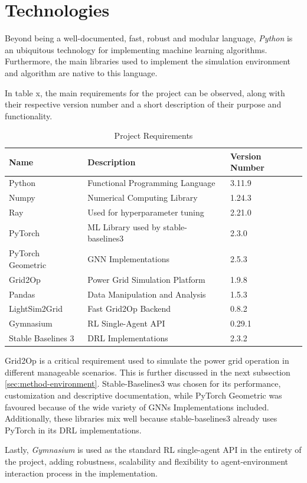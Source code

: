 \section{Technologies} \label{sec:method-technologies}

Beyond being a well-documented, fast, robust and modular language, \textit{Python} is an ubiquitous technology for implementing machine learning algorithms. Furthermore, the main libraries used to implement the simulation environment and algorithm are native to this language. \par
In table x, the main requirements for the project can be observed, along with their respective version number and a short description of their purpose and functionality.
\par

\begin{table}
	\begin{tabular}{|l|l|l|}
		\hline
		\textbf{Name} & \textbf{Description} & \textbf{Version Number} \\
		\hline
		Python & Functional Programming Language & 3.11.9 \\
		\hline
		Numpy & Numerical Computing Library& 1.24.3 \\
		\hline
		Ray & Used for hyperparameter tuning & 2.21.0 \\
		\hline
		PyTorch & \acs{ML} Library used by stable-baselines3 & 2.3.0 \\
		\hline
		PyTorch Geometric & \ac{GNN} Implementations & 2.5.3 \\
		\hline
		Grid2Op & Power Grid Simulation Platform & 1.9.8 \\
		\hline
		Pandas & Data Manipulation and Analysis & 1.5.3 \\
		\hline
		LightSim2Grid & Fast Grid2Op Backend & 0.8.2 \\
		\hline
		Gymnasium & \ac{RL} Single-Agent API & 0.29.1 \\
		\hline
		Stable Baselines 3 & \ac{DRL} Implementations & 2.3.2 \\
		\hline
	\end{tabular}
	\caption{Project Requirements}
\end{table}

Grid2Op is a critical requirement used to simulate the power grid operation in different manageable scenarios. This is further discussed in the next subsection \ref{sec:method-environment}. Stable-Baselines3 was chosen for its performance, customization and descriptive documentation, while PyTorch Geometric was favoured because of the wide variety of \acp{GNN} Implementations included. Additionally, these libraries mix well because stable-baselines3 already uses PyTorch in its \ac{DRL} implementations.
\par
Lastly, \textit{Gymnasium} is used as the standard \ac{RL} single-agent API in the entirety of the project, adding robustness, scalability and flexibility to agent-environment interaction process in the implementation.  \par

